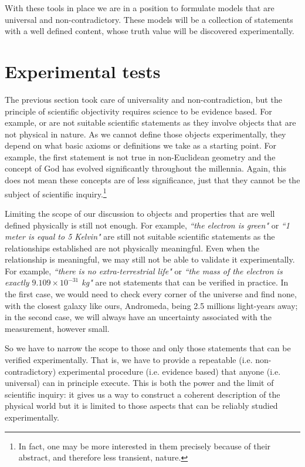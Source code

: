 \documentclass[11pt,letterpaper,fleqn]{memoir} %
\begin{document}
With these tools in place we are in a position to formulate models that are universal and non-contradictory. These models will be a collection of statements with a well defined content, whose truth value will be discovered experimentally.

\section{Experimental tests}

The previous section took care of universality and non-contradiction, but the principle of scientific objectivity requires science to be evidence based. For example,  or  are not suitable scientific statements as they involve objects that are not physical in nature. As we cannot define those objects experimentally, they depend on what basic axioms or definitions we take as a starting point. For example, the first statement is not true in non-Euclidean geometry and the concept of God has evolved significantly throughout the millennia. Again, this does not mean these concepts are of less significance, just that they cannot be the subject of scientific inquiry.\footnote{In fact, one may be more interested in them precisely because of their abstract, and therefore less transient, nature.}

Limiting the scope of our discussion to objects and properties that are well defined physically is still not enough. For example, \emph{``the electron is green"} or \emph{``1 meter is equal to 5 Kelvin"} are still not suitable scientific statements as the relationships established are not physically meaningful. Even when the relationship is meaningful, we may still not be able to validate it experimentally. For example, \emph{``there is no extra-terrestrial life"} or \emph{``the mass of the electron is exactly $9.109 \times 10^{-31}$ kg"} are not statements that can be verified in practice. In the first case, we would need to check every corner of the universe and find none, with the closest galaxy like ours, Andromeda, being 2.5 millions light-years away; in the second case, we will always have an uncertainty associated with the measurement, however small.

So we have to narrow the scope to those and only those statements that can be verified experimentally. That is, we have to provide a repeatable (i.e. non-contradictory) experimental procedure (i.e. evidence based) that anyone (i.e. universal) can in principle execute. This is both the power and the limit of scientific inquiry: it gives us a way to construct a coherent description of the physical world but it is limited to those aspects that can be reliably studied experimentally.
\end{document}
